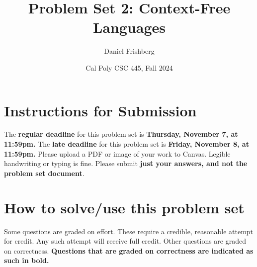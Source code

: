 \documentclass{article}
\title{Problem Set 2: Context-Free Languages}
\author{Daniel Frishberg}
\date{Cal Poly CSC 445, Fall 2024}
\theoremstyle{definition}
\begin{document}
\lstset{upquote=true}
\setlength\parindent{0em}

\maketitle
\section{Instructions for Submission}
The \textbf{regular deadline} for this problem set is \textbf{Thursday, November 7, at 11:59pm.} The \textbf{late deadline} for this problem set is \textbf{Friday, November 8, at 11:59pm.} Please upload a PDF or image of your work to Canvas. Legible handwriting or typing is fine. Please submit \textbf{just your answers, and not the problem set document}.

\section{How to solve/use this problem set}
Some questions are graded on effort. These require a credible, reasonable attempt for credit. Any such attempt will receive full credit. Other questions are graded on correctness.
\textbf{Questions that are graded on correctness are indicated as such in bold.}
\end{document}
